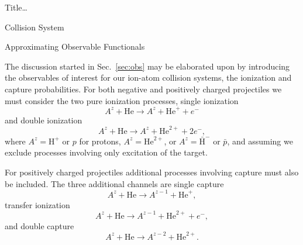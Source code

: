 \documentclass[letterpaper, 10 pt]{report}
\begin{document}
\begin{chapter}{ Title\dots \label{chap:p-he2p-he}}
\begin{section}{Collision System \label{sec:p-he2p-he-sys}}
   \end{section}

   \begin{section}{Approximating Observable Functionals \label{sec:phe2p-obs}}

      The discussion started in Sec.~\ref{sec:obs} may be elaborated upon by introducing the observables
      of interest for our ion-atom collision systems, the ionization and capture probabilities. For both
      negative and positively charged projectiles we must consider the two pure ionization processes,
      single ionization
      \begin{equation} \label{eq:TI}
         A^z + \mathrm{He} \rightarrow A^z + \mathrm{He}^+ + e^-
      \end{equation}
      and double ionization
      \begin{equation} \label{eq:II}
         A^z + \mathrm{He} \rightarrow A^z + \mathrm{He}^{2+} + 2e^-,
      \end{equation}
      where $A^z = \mathrm{H}^+$ or $p$ for protons, $A^z = \mathrm{He}^{2+}$, or $A^z =
      \bar{\mathrm{H}}^-$ or $\bar{p}$, and assuming we exclude processes involving only excitation of
      the target.

      For positively charged projectiles additional processes involving capture must also be included.
      The three additional channels are single capture
      \begin{equation} \label{eq:TP}
         A^z + \mathrm{He} \rightarrow A^{z-1} + \mathrm{He}^{+},
      \end{equation}
      transfer ionization
      \begin{equation} \label{eq:IP}
         A^z + \mathrm{He} \rightarrow A^{z-1} + \mathrm{He}^{2+} + e^-,
      \end{equation}
      and double capture
      \begin{equation} \label{eq:PP}
         A^z + \mathrm{He} \rightarrow A^{z-2} + \mathrm{He}^{2+}.
      \end{equation}


\end{section}
\end{chapter}
\end{document}
